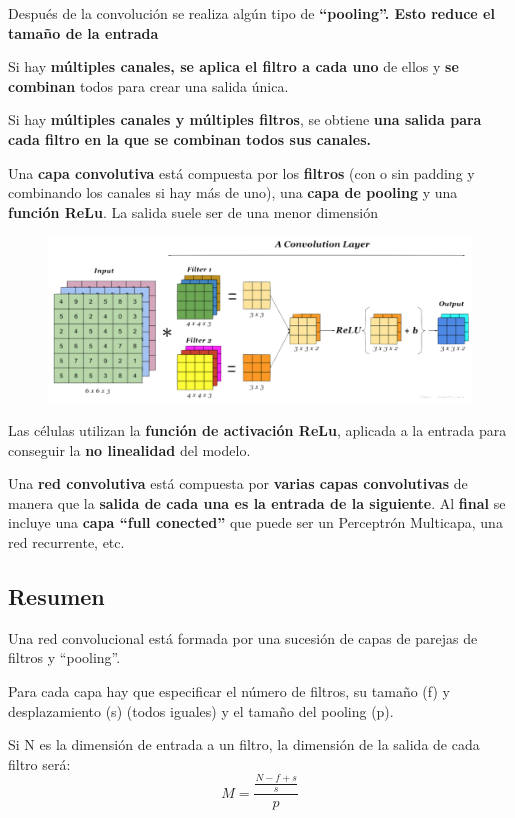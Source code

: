 \documentclass[12pt, twoside, openright]{report} %
\begin{document}
Después de la convolución se realiza algún tipo de \textbf{“pooling”. Esto reduce el tamaño de la entrada}

Si hay \textbf{múltiples canales, se aplica el filtro a cada uno} de ellos y \textbf{se combinan} todos para crear una salida única.

Si hay \textbf{múltiples canales y múltiples filtros}, se obtiene \textbf{una salida para cada filtro en la que se combinan todos sus canales.}

Una \textbf{capa convolutiva} está compuesta por los \textbf{filtros} (con o sin padding y combinando los canales si hay más de uno), una \textbf{capa de pooling} y una \textbf{función ReLu}. La salida suele ser de una menor dimensión

\begin{figure}[H]
	{\includegraphics[scale=.35]{capaConvo.jpg}}
\end{figure}

Las células utilizan la \textbf{función de activación ReLu}, aplicada a la entrada para conseguir la \textbf{no linealidad} del modelo.
\pagebreak

Una \textbf{red convolutiva} está compuesta por \textbf{varias capas convolutivas} de manera que la \textbf{salida de cada una es la entrada de la siguiente}. Al \textbf{final} se incluye una \textbf{capa “full conected”} que puede ser un Perceptrón Multicapa, una red recurrente, etc.

\subsection{Resumen}
Una red convolucional está formada por una sucesión de capas de parejas de filtros y “pooling”.

Para cada capa hay que especificar el número de filtros, su tamaño (f) y desplazamiento (s) (todos iguales) y el tamaño del pooling (p).

Si N es la dimensión de entrada a un filtro, la dimensión de la salida de cada filtro será: 
$$M=\frac{\frac{N-f+s}{s}}{p}$$
\end{document}
